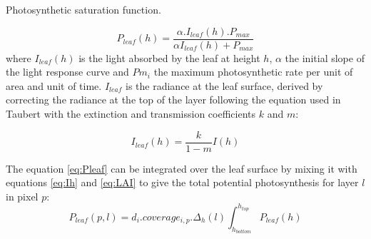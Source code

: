 \begin{marginfigure}[-12pt]
\label{fig:derivaives}
\caption{Photosynthetic saturation function.}
\end{marginfigure}

\begin{equation}\label{eq:Pleaf}
P_{leaf}(h) = \frac{\alpha. I_{leaf}(h).P_{max}}{\alpha I_{leaf}(h)+P_{max}}
\end{equation}
where $I_{leaf}(h)$ is the light absorbed by the leaf at height $h$, $\alpha$ the initial slope of the light response curve and $Pm_{i}$ the maximum photosynthetic rate per unit of area and unit of time.
$I_{leaf}$ is the radiance at the leaf surface, derived by correcting the radiance at the top of the layer following the equation used in Taubert with the extinction and transmission coefficients $k$ and $m$:

\begin{equation}
I_{leaf}(h) = \frac{k}{1-m}I(h)
\end{equation}

The equation \eqref{eq:Pleaf} can be integrated over the leaf surface by mixing it with equations \eqref{eq:Ih} and \eqref{eq:LAI} to give the total potential photosynthesis for layer $l$ in pixel $p$:
\begin{equation}\label{Ppixlay}
P_{leaf}(p,l) = d_{i}.coverage_{i, p}.\Delta_{h}(l)\int_{h_{bottom}}^{h_{top}}P_{leaf}(h)
\end{equation}
%

